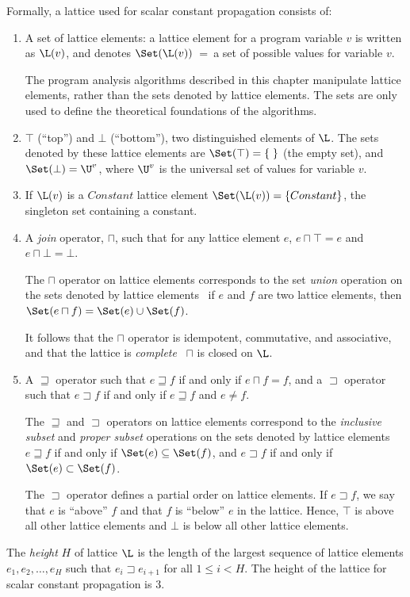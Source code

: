 Formally, a lattice used for scalar constant
propagation consists of:
\begin{enumerate}
\item A set of lattice elements:
a lattice element for a program variable $v$ is written
as $\L(v)$, and denotes $\Set(\L(v))$~=~a set of possible values for
variable $v$.

The program analysis algorithms described in this chapter manipulate
lattice elements, rather than the sets denoted by lattice
elements.  The sets are only used to define the theoretical foundations
of the algorithms.

\item $\top$ (``top'') and $\bot$ (``bottom''), two distinguished
elements of $\L$.
The sets denoted by these lattice elements are
$\Set(\top) = \{\;\}$ (the empty set), and $\Set(\bot) = \U^v$,
where $\U^v$ is the universal set of values for variable
$v$.
\item  If $\L(v)$ is a $Constant$ lattice element
$\Set(\L(v)) = \{Constant\}$, the singleton set containing a constant.
\item A {\it join}
operator, $\sqcap$, such that for any lattice element $e$,
$e \sqcap \top = e$ and $e \sqcap \bot = \bot$. 

The $\sqcap$ operator on lattice elements corresponds to the set {\it union}
operation on the sets denoted by lattice elements
\ie\ if $e$ and $f$ are two lattice elements, then 
$\Set(e \sqcap f) = \Set(e) \cup \Set(f)$.

It follows that the $\sqcap$
operator is idempotent, commutative, and associative, and 
that the lattice is {\it complete} \ie\ $\sqcap$ is closed
on $\L$.
\item A $\sqsupseteq$ operator such that $e \sqsupseteq f$ if and only if
$e \sqcap f = f$, and a $\sqsupset$ operator such that $e \sqsupset f$
if and only if $e \sqsupseteq f$ and $e \not= f$.

The $\sqsupseteq$ and $\sqsupset$ operators on lattice elements
correspond to the {\it inclusive subset} and {\it proper subset}
operations on the sets denoted by lattice elements \ie\
$e \sqsupseteq f$ if and only if $\Set(e) \subseteq \Set(f)$, and
$e \sqsupset f$ if and only if $\Set(e) \subset \Set(f)$.

The $\sqsupset$ operator defines a partial order on lattice elements.
If $e \sqsupset f$, we say that $e$ is ``above'' $f$ and that $f$ is ``below''
$e$ in the lattice.  Hence, $\top$ is above all other lattice elements
and $\bot$ is below all other lattice elements.
\end{enumerate}
The {\it height} $H$ of lattice $\L$ is the length of the largest 
sequence of lattice elements $e_1, e_2, \ldots, e_H$ such that
$e_i \sqsupset e_{i+1}$ for all $1 \leq i < H$. The height of the
lattice for scalar constant propagation is 3.


